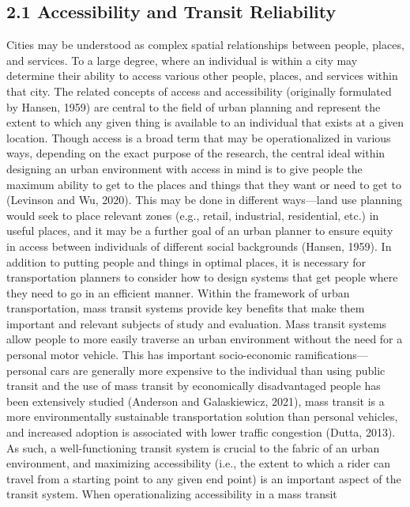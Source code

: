 \documentclass[
  12pt,
]{article}
\begin{document}
\subsection{2.1 Accessibility and Transit
Reliability}\label{accessibility-and-transit-reliability}

Cities may be understood as complex spatial relationships between
people, places, and services. To a large degree, where an individual is
within a city may determine their ability to access various other
people, places, and services within that city. The related concepts of
access and accessibility (originally formulated by Hansen, 1959) are
central to the field of urban planning and represent the extent to which
any given thing is available to an individual that exists at a given
location. Though access is a broad term that may be operationalized in
various ways, depending on the exact purpose of the research, the
central ideal within designing an urban environment with access in mind
is to give people the maximum ability to get to the places and things
that they want or need to get to (Levinson and Wu, 2020). This may be
done in different ways---land use planning would seek to place relevant
zones (e.g., retail, industrial, residential, etc.) in useful places,
and it may be a further goal of an urban planner to ensure equity in
access between individuals of different social backgrounds (Hansen,
1959). In addition to putting people and things in optimal places, it is
necessary for transportation planners to consider how to design systems
that get people where they need to go in an efficient manner. Within the
framework of urban transportation, mass transit systems provide key
benefits that make them important and relevant subjects of study and
evaluation. Mass transit systems allow people to more easily traverse an
urban environment without the need for a personal motor vehicle. This
has important socio-economic ramifications---personal cars are generally
more expensive to the individual than using public transit and the use
of mass transit by economically disadvantaged people has been
extensively studied (Anderson and Galaskiewicz, 2021), mass transit is a
more environmentally sustainable transportation solution than personal
vehicles, and increased adoption is associated with lower traffic
congestion (Dutta, 2013). As such, a well-functioning transit system is
crucial to the fabric of an urban environment, and maximizing
accessibility (i.e., the extent to which a rider can travel from a
starting point to any given end point) is an important aspect of the
transit system. When operationalizing accessibility in a mass transit
\end{document}
